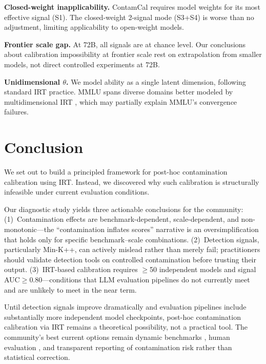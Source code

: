 \documentclass[11pt,a4paper]{article}
\begin{document}
\textbf{Closed-weight inapplicability.}
ContamCal requires model weights for its most effective signal (S1).
The closed-weight 2-signal mode (S3+S4) is worse than no adjustment, limiting applicability to open-weight models.

\textbf{Frontier scale gap.}
At 72B, all signals are at chance level.
Our conclusions about calibration impossibility at frontier scale rest on extrapolation from smaller models, not direct controlled experiments at 72B.

\textbf{Unidimensional $\theta$.}
We model ability as a single latent dimension, following standard IRT practice.
MMLU spans diverse domains better modeled by multidimensional IRT \cite{reckase2009multidimensional,burnell2023rethink}, which may partially explain MMLU's convergence failures.

\section{Conclusion}
\label{sec:conclusion}

We set out to build a principled framework for post-hoc contamination calibration using IRT.
Instead, we discovered why such calibration is structurally infeasible under current evaluation conditions.

Our diagnostic study yields three actionable conclusions for the community:
(1)~Contamination effects are benchmark-dependent, scale-dependent, and non-monotonic---the ``contamination inflates scores'' narrative is an oversimplification that holds only for specific benchmark--scale combinations.
(2)~Detection signals, particularly Min-K++, can actively mislead rather than merely fail; practitioners should validate detection tools on controlled contamination before trusting their output.
(3)~IRT-based calibration requires $\geq$50 independent models and signal AUC$\geq$0.80---conditions that LLM evaluation pipelines do not currently meet and are unlikely to meet in the near term.

Until detection signals improve dramatically and evaluation pipelines include substantially more independent model checkpoints, post-hoc contamination calibration via IRT remains a theoretical possibility, not a practical tool.
The community's best current options remain dynamic benchmarks \cite{white2024livebench}, human evaluation \cite{zheng2024judging}, and transparent reporting of contamination risk rather than statistical correction.
\end{document}
